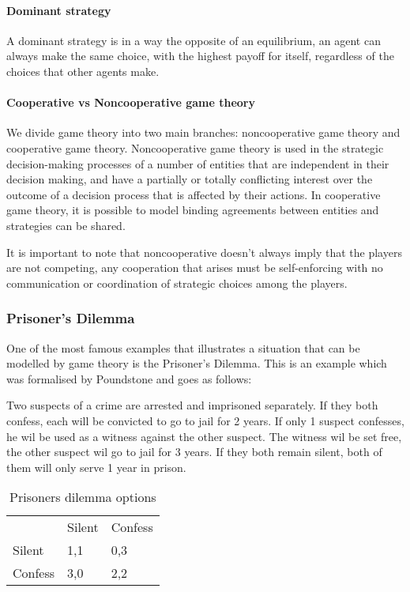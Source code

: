 \paragraph{Dominant strategy} 
A dominant strategy is in a way the opposite of an equilibrium, an agent can always make the same choice, with the highest payoff for itself, regardless of the choices that other agents make. 

\paragraph{Cooperative vs Noncooperative game theory} 
We divide game theory into two main branches: noncooperative game theory and cooperative game theory. Noncooperative game theory is used in the strategic decision-making processes of a number of entities that are independent in their decision making, and have a partially or totally conflicting interest over the outcome of a decision process that is affected by their actions\cite{keypaper}. In cooperative game theory, it is possible to model binding agreements between entities and strategies can be shared. 

It is important to note that noncooperative doesn't always imply that the players are not competing, any cooperation that arises must be self-enforcing with no communication or coordination of strategic choices among the players.\cite{keypaper}

\subsubsection{Prisoner's Dilemma}
One of the most famous examples that illustrates a situation that can be modelled by game theory is the Prisoner's Dilemma. This is an example which was formalised by Poundstone \cite{poundstone} and goes as follows: 

Two suspects of a crime are arrested and imprisoned separately. If they both confess, each will be convicted to go to jail for 2 years. If only 1 suspect confesses, he wil be used as a witness against the other suspect. The witness wil be set free, the other suspect wil go to jail for 3 years. If they both remain silent, both of them will only serve 1 year in prison.

\begin{table}[h]
\centering
\begin{tabular}{lll}
 & Silent & Confess \\ \cline{2-3} 
\multicolumn{1}{l|}{Silent} & \multicolumn{1}{l|}{1,1} & \multicolumn{1}{l|}{0,3} \\ \cline{2-3} 
\multicolumn{1}{l|}{Confess} & \multicolumn{1}{l|}{3,0} & \multicolumn{1}{l|}{2,2} \\ \cline{2-3} 
\end{tabular}
\caption{Prisoners dilemma options}
\label{prisoners-d}
\end{table}

